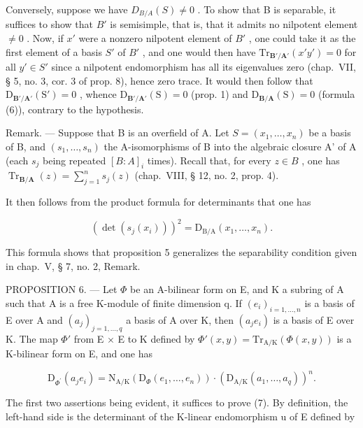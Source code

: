 Conversely, suppose we have \(D_{B/A}(S) \neq 0\) . To show that B is separable, it suffices to show that \(B'\) is semisimple, that is, that it admits no nilpotent element \(\neq 0\) . Now, if \(x'\) were a nonzero nilpotent element of \(B'\) , one could take it as the first element of a basis \(S'\) of \(B'\) , and one would then have \(\mathrm{Tr}_{\mathbf{B}'/\mathbf{A}'}(x'y') = 0\) for all \(y' \in S'\) since a nilpotent endomorphism has all its eigenvalues zero (chap.~VII, § 5, no. 3, cor. 3 of prop. 8), hence zero trace. It would then follow that \(\mathrm{D}_{\mathbf{B}'/\mathbf{A}'}(\mathrm{S}') = 0\) , whence \(\mathrm{D}_{\mathbf{B}'/\mathbf{A}'}(\mathrm{S}) = 0\) (prop. 1) and \(\mathrm{D}_{\mathbf{B}/\mathbf{A}}(\mathrm{S}) = 0\) (formula (6)), contrary to the hypothesis.

Remark. --- Suppose that B is an overfield of A. Let \(S = (x_{1}, \ldots, x_{n})\) be a basis of B, and \((s_{1}, \ldots, s_{n})\) the A-isomorphisms of B into the algebraic closure A' of A (each \(s_{j}\) being repeated \([B : A]_{i}\) times). Recall that, for every \(z \in B\) , one has \(\operatorname{Tr}_{\mathbf{B}/\mathbf{A}}(z) = \sum_{j=1}^{n} s_{j}(z)\) (chap.~VIII, § 12, no. 2, prop. 4).

It then follows from the product formula for determinants that one has

\[
(\det (s _ {j} (x _ {i}))) ^ {2} = \mathrm{D} _ {\mathrm{B/A}} (x _ {1}, \dots , x _ {n}).\tag{7}
\]

This formula shows that proposition 5 generalizes the separability condition given in chap.~V, § 7, no. 2, Remark.

PROPOSITION 6. --- Let \(\Phi\) be an A-bilinear form on E, and K a subring of A such that A is a free K-module of finite dimension q. If \((e_i)_{i=1,\ldots,n}\) is a basis of E over A and \((a_j)_{j=1,\ldots,q}\) a basis of A over K, then \((a_j e_i)\) is a basis of E over K. The map \(\Phi'\) from E \(\times\) E to K defined by \(\Phi'(x,y)=\mathrm{Tr}_{\mathrm{A/K}}(\Phi(x,y))\) is a K-bilinear form on E, and one has

\[
\mathrm{D} _ {\Phi^ {\prime}} (a _ {j} e _ {i}) = \mathrm{N} _ {\mathrm{A} / \mathrm{K}} (\mathrm{D} _ {\Phi} (e _ {1}, \dots , e _ {n})) \cdot (\mathrm{D} _ {\mathrm{A} / \mathrm{K}} (a _ {1}, \dots , a _ {q})) ^ {n}.\tag{8}
\]

The first two assertions being evident, it suffices to prove (7). By definition, the left-hand side is the determinant of the K-linear endomorphism u of E defined by


